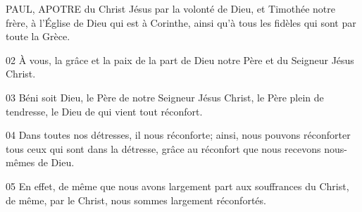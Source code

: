 PAUL, APOTRE du Christ Jésus par la volonté de Dieu, et Timothée notre frère, à l’Église de Dieu qui est à Corinthe, ainsi qu’à tous les fidèles qui sont par toute la Grèce.

02 À vous, la grâce et la paix de la part de Dieu notre Père et du Seigneur Jésus Christ.

03 Béni soit Dieu, le Père de notre Seigneur Jésus Christ, le Père plein de tendresse, le Dieu de qui vient tout réconfort.

04 Dans toutes nos détresses, il nous réconforte; ainsi, nous pouvons réconforter tous ceux qui sont dans la détresse, grâce au réconfort que nous recevons nous-mêmes de Dieu.

05 En effet, de même que nous avons largement part aux souffrances du Christ, de même, par le Christ, nous sommes largement réconfortés.
